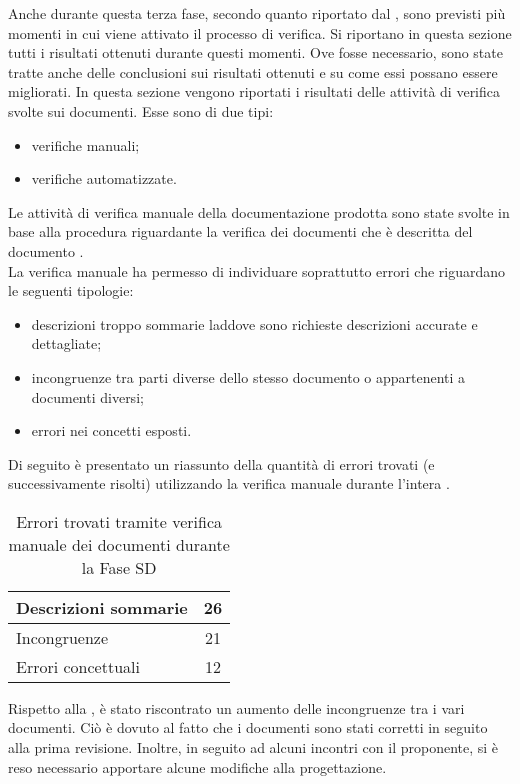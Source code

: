  \label{app:esiti}
Anche durante questa terza fase, secondo quanto riportato dal , sono previsti più momenti in cui viene attivato il processo di verifica. Si riportano in questa sezione tutti i risultati ottenuti durante questi momenti. Ove fosse necessario, sono state tratte anche delle conclusioni sui risultati ottenuti e su come essi possano essere migliorati.
			In questa sezione vengono riportati i risultati delle attività di verifica svolte sui documenti. Esse sono di due tipi:
			\begin{itemize}
				\item verifiche manuali;
				\item verifiche automatizzate.
			\end{itemize}
				Le attività di verifica manuale della documentazione prodotta sono state svolte in base alla procedura riguardante la verifica dei 
				documenti che è descritta del documento .\\
				La verifica manuale ha permesso di individuare soprattutto errori che riguardano le seguenti tipologie:
				\begin{itemize}
					\item descrizioni troppo sommarie laddove sono richieste descrizioni accurate e dettagliate;
					\item incongruenze tra parti diverse dello stesso documento o appartenenti a documenti diversi;
					\item errori nei concetti esposti.
				\end{itemize}
				Di seguito è presentato un riassunto della quantità di errori trovati (e successivamente risolti) utilizzando la verifica manuale durante l'intera .
				\begin{table}[H]
					\centering
					\begin{tabu}{| l | c |}
						\hline
						Descrizioni sommarie	&	26\\ \hline
						Incongruenze	&	21\\ \hline
						Errori concettuali	&	12\\ \hline
					\end{tabu}
					\caption{Errori trovati tramite verifica manuale dei documenti durante la Fase SD}
				\end{table}
				Rispetto alla , è stato riscontrato un aumento delle incongruenze tra i vari documenti. Ciò è dovuto al fatto che i documenti sono stati corretti in seguito alla prima revisione. Inoltre, in seguito ad alcuni incontri con il proponente, si è reso necessario apportare alcune modifiche alla progettazione.\\
